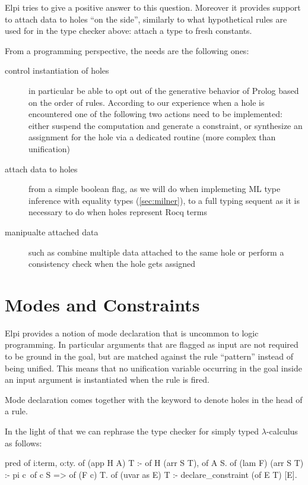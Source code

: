 \documentclass[a4paper, 11pt]{book}
\begin{document}
Elpi tries to give a positive answer to this question. Moreover it provides
support to attach data to holes ``on the side'', similarly to what
hypothetical rules are used for in the type checker above: attach a type
to fresh constants.

From a programming perspective, the needs are the following ones:

\begin{description}
  \item[control instantiation of holes] in particular be able to opt out of the
     generative behavior of Prolog based on the order of rules. According to
     our experience when a hole is encountered one of the following two
     actions need to be implemented: either suspend the computation and
     generate a constraint, or synthesize an assignment for the hole
     via a dedicated routine (more complex than unification)
  \item[attach data to holes] from a simple boolean flag, as we will do
    when implemeting ML type inference with equality types (\cref{sec:milner}),
    to a full typing sequent as it is necessary to do when holes represent
    Rocq terms

  \item[manipualte attached data] such as combine multiple data attached to the same
     hole or perform a consistency check when the hole gets assigned

\end{description}


\section{Modes and Constraints}\label{sec:modes}

Elpi provides a notion of mode declaration that is uncommon to logic programming.
In particular arguments that are flagged as input are not required to be
ground in the goal, but are matched against the rule ``pattern'' instead 
of being unified. This means that no unification variable occurring in
the goal inside an input argument is instantiated when the rule is
fired.

Mode declaration comes together with the  keyword to denote
holes in the head of a rule.

In the light of that we can rephrase the type checker for simply typed
$\lambda$-calculus as follows:

\begin{elpicode}
pred of i:term, o:ty.
of (app H A) T :- of H (arr S T), of A S.
of (lam F) (arr S T) :- pi c\ of c S => of (F c) T.
of (uvar as E) T :- declare_constraint (of E T) [E].
\end{elpicode} 
\end{document}

